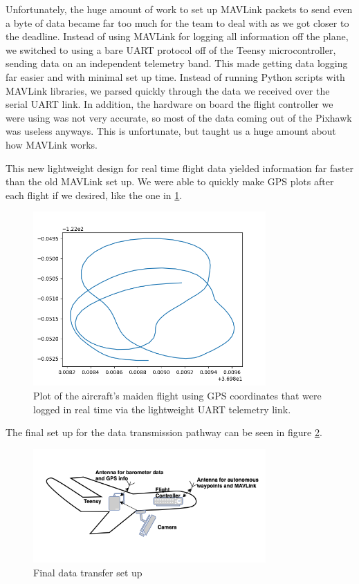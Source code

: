 \documentclass[12pt,journal,compsoc]{IEEEtran}
\begin{document}
Unfortunately, the huge amount of work to set up MAVLink packets to send even a byte of data became far too much for the team to deal with as we got closer to the deadline. Instead of using MAVLink for logging all information off the plane, we switched to using a bare UART protocol off of the Teensy microcontroller, sending data on an independent telemetry band. This made getting data logging far easier and with minimal set up time. Instead of running Python scripts with MAVLink libraries, we parsed quickly through the data we received over the serial UART link. In addition, the hardware on board the flight controller we were using was not very accurate, so most of the data coming out of the Pixhawk was useless anyways. This is unfortunate, but taught us a huge amount about how MAVLink works.

This new lightweight design for real time flight data yielded information far faster than the old MAVLink set up. We were able to quickly make GPS plots after each flight if we desired, like the one in \ref{flyingGraph}.

\begin{figure}[h!]
\hspace*{0cm}
\centering
\includegraphics[width=3.5in]{flight02-22-2019_maiden.png}
\caption{Plot of the aircraft's maiden flight using GPS coordinates that were logged in real time via the lightweight UART telemetry link.}
\label{flyingGraph}
\end{figure}

The final set up for the data transmission pathway can be seen in figure \ref{Version4}.

\begin{figure}[h!]
\hspace*{0cm}
\centering
\includegraphics[width=3.5in]{Version4.png}
\caption{Final data transfer set up}
\label{Version4}
\end{figure}
\end{document}
